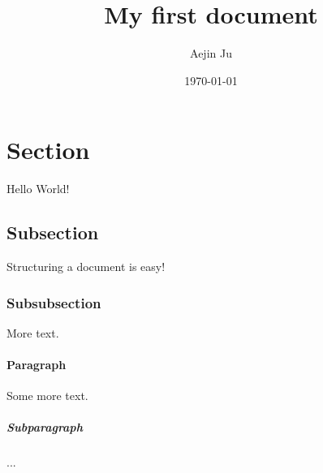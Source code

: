 \documentclass{article}
\title{My first document}
\date{\today}
\author{Aejin Ju}
\begin{document}
	\maketitle
	
	\newpage
	\tableofcontents

	\newpage
	
	\section{Section}
	
	Hello World!

	\subsection{Subsection}
	
	Structuring a document is easy!
	
	\subsubsection{Subsubsection}
	
	More text.
	
	\paragraph{Paragraph}
	
	Some more text.
	
	\subparagraph{Subparagraph}	
	
	...
	
\end{document}
